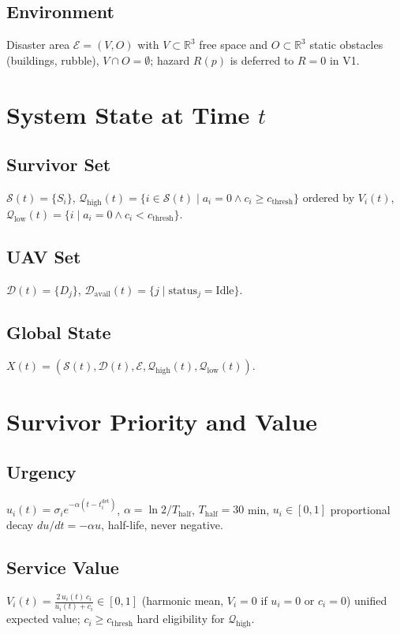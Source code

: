 \documentclass[conference]{IEEEtran}
\begin{document}
\subsection{Environment}
Disaster area $\mathcal{E}=(V,O)$ with $V\subset\mathbb{R}^3$ free space and $O\subset\mathbb{R}^3$ static obstacles (buildings, rubble), $V\cap O=\emptyset$; hazard $R(p)$ is deferred to $R=0$ in V1.

\section{System State at Time $t$}

\subsection{Survivor Set}
$\mathcal{S}(t)=\{S_i\}$, $\mathcal{Q}_{\text{high}}(t)=\{i\in\mathcal{S}(t)\mid a_i=0\land c_i\ge c_{\text{thresh}}\}$ ordered by $V_i(t)$, $\mathcal{Q}_{\text{low}}(t)=\{i\mid a_i=0\land c_i<c_{\text{thresh}}\}$.

\subsection{UAV Set}
$\mathcal{D}(t)=\{D_j\}$, $\mathcal{D}_{\text{avail}}(t)=\{j\mid \text{status}_j=\text{Idle}\}$.

\subsection{Global State}
$X(t)=(\mathcal{S}(t),\mathcal{D}(t),\mathcal{E},\mathcal{Q}_{\text{high}}(t),\mathcal{Q}_{\text{low}}(t))$.

\section{Survivor Priority and Value}

\subsection{Urgency}
$u_i(t)=\sigma_i e^{-\alpha(t-t_i^{\text{det}})}$, $\alpha=\ln2/T_{\text{half}}$, $T_{\text{half}}=30$ min, $u_i\in[0,1]$ proportional decay $du/dt=-\alpha u$, half-life, never negative.

\subsection{Service Value}
$V_i(t)=\frac{2\,u_i(t)\,c_i}{u_i(t)+c_i}\in[0,1]$ (harmonic mean, $V_i=0$ if $u_i=0$ or $c_i=0$) unified expected value; $c_i\geq c_{\text{thresh}}$ hard eligibility for $\mathcal{Q}_{\text{high}}$.
\end{document}

